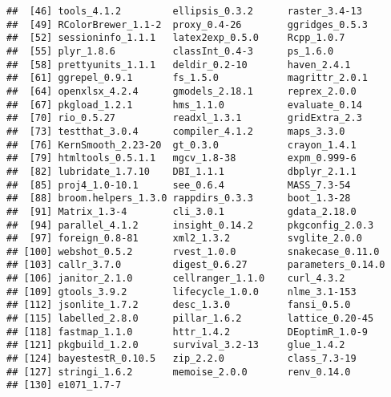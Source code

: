 \documentclass[
  12pt,
]{article}
\begin{document}
\begin{verbatim}
##  [46] tools_4.1.2         ellipsis_0.3.2      raster_3.4-13      
##  [49] RColorBrewer_1.1-2  proxy_0.4-26        ggridges_0.5.3     
##  [52] sessioninfo_1.1.1   latex2exp_0.5.0     Rcpp_1.0.7         
##  [55] plyr_1.8.6          classInt_0.4-3      ps_1.6.0           
##  [58] prettyunits_1.1.1   deldir_0.2-10       haven_2.4.1        
##  [61] ggrepel_0.9.1       fs_1.5.0            magrittr_2.0.1     
##  [64] openxlsx_4.2.4      gmodels_2.18.1      reprex_2.0.0       
##  [67] pkgload_1.2.1       hms_1.1.0           evaluate_0.14      
##  [70] rio_0.5.27          readxl_1.3.1        gridExtra_2.3      
##  [73] testthat_3.0.4      compiler_4.1.2      maps_3.3.0         
##  [76] KernSmooth_2.23-20  gt_0.3.0            crayon_1.4.1       
##  [79] htmltools_0.5.1.1   mgcv_1.8-38         expm_0.999-6       
##  [82] lubridate_1.7.10    DBI_1.1.1           dbplyr_2.1.1       
##  [85] proj4_1.0-10.1      see_0.6.4           MASS_7.3-54        
##  [88] broom.helpers_1.3.0 rappdirs_0.3.3      boot_1.3-28        
##  [91] Matrix_1.3-4        cli_3.0.1           gdata_2.18.0       
##  [94] parallel_4.1.2      insight_0.14.2      pkgconfig_2.0.3    
##  [97] foreign_0.8-81      xml2_1.3.2          svglite_2.0.0      
## [100] webshot_0.5.2       rvest_1.0.0         snakecase_0.11.0   
## [103] callr_3.7.0         digest_0.6.27       parameters_0.14.0  
## [106] janitor_2.1.0       cellranger_1.1.0    curl_4.3.2         
## [109] gtools_3.9.2        lifecycle_1.0.0     nlme_3.1-153       
## [112] jsonlite_1.7.2      desc_1.3.0          fansi_0.5.0        
## [115] labelled_2.8.0      pillar_1.6.2        lattice_0.20-45    
## [118] fastmap_1.1.0       httr_1.4.2          DEoptimR_1.0-9     
## [121] pkgbuild_1.2.0      survival_3.2-13     glue_1.4.2         
## [124] bayestestR_0.10.5   zip_2.2.0           class_7.3-19       
## [127] stringi_1.6.2       memoise_2.0.0       renv_0.14.0        
## [130] e1071_1.7-7
\end{verbatim}
\end{document}
